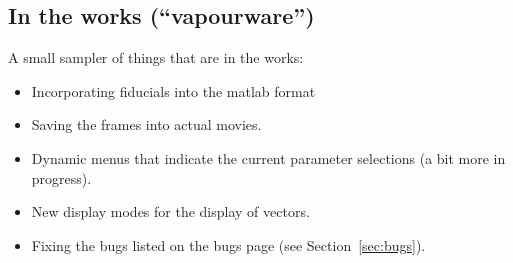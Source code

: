 \subsection{In the works (``vapourware'')}
\label{sec:vapourware}

A small sampler of things that are in the works:

\begin{itemize}
  \item Incorporating fiducials into the matlab format
  \item Saving the frames into actual movies.
  \item Dynamic menus that indicate the current parameter selections
    (a bit more in progress).
  \item New display modes for the display of vectors.
  \item Fixing the bugs listed on the bugs page (see
    Section~\ref{sec:bugs}).
\end{itemize}



